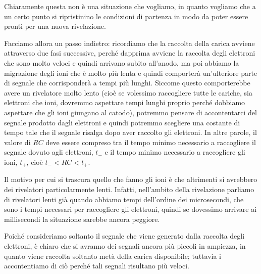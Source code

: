 Chiaramente questa non è una situazione che vogliamo, in quanto vogliamo che a un certo punto si ripristinino le condizioni di partenza in modo da poter essere pronti per una nuova rivelazione.

Facciamo allora un passo indietro: ricordiamo che la raccolta della carica avviene attraverso due fasi successive, perché dapprima avviene la raccolta degli elettroni che sono molto veloci e quindi arrivano subito all'anodo, ma poi abbiamo la migrazione degli ioni che è molto più lenta e quindi comporterà un'ulteriore parte di segnale che corrisponderà a tempi più lunghi. Siccome questo comporterebbe avere un rivelatore molto lento (cioè se volessimo raccogliere tutte le cariche, sia elettroni che ioni, dovremmo aspettare tempi lunghi proprio perché dobbiamo aspettare che gli ioni giungano al catodo), potremmo pensare di accontentarci del segnale prodotto dagli elettroni e quindi potremmo scegliere una costante di tempo tale che il segnale risalga dopo aver raccolto gli elettroni. In altre parole, il valore di $RC$ deve essere compreso tra il tempo minimo necessario a raccogliere il segnale dovuto agli elettroni, $t_{-}$ e il tempo minimo necessario a raccogliere gli ioni, $t_{+}$, cioè $t_{-} < RC < t_{+}$.

Il motivo per cui si trascura quello che fanno gli ioni è che altrimenti si avrebbero dei rivelatori particolarmente lenti. Infatti, nell'ambito della rivelazione parliamo di rivelatori lenti già quando abbiamo tempi dell'ordine dei microsecondi, che sono i tempi necessari per raccogliere gli elettroni, quindi se dovessimo arrivare ai millisecondi la situazione sarebbe ancora peggiore.

\begin{figure}[H]
   \centering
\end{figure}

Poiché consideriamo soltanto il segnale che viene generato dalla raccolta degli elettroni, è chiaro che si avranno dei segnali ancora più piccoli in ampiezza, in quanto viene raccolta soltanto metà della carica disponibile; tuttavia i accontentiamo di ciò perché tali segnali risultano più veloci.

